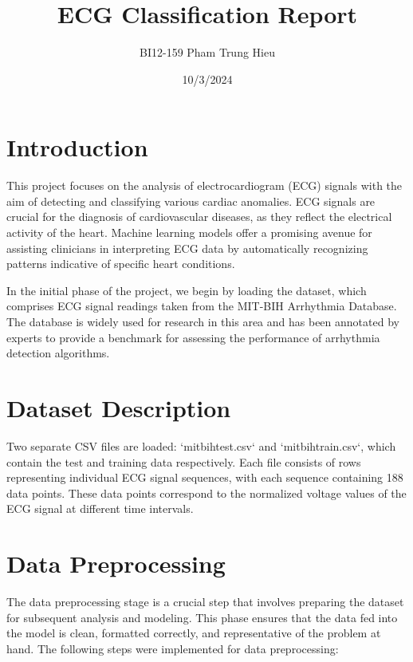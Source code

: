 \documentclass{report}
\title{ECG Classification Report}
\author{BI12-159 Pham Trung Hieu}
\date{10/3/2024}
\begin{document}

\section{Introduction}

This project focuses on the analysis of electrocardiogram (ECG) signals with the aim of detecting and classifying various cardiac anomalies. ECG signals are crucial for the diagnosis of cardiovascular diseases, as they reflect the electrical activity of the heart. Machine learning models offer a promising avenue for assisting clinicians in interpreting ECG data by automatically recognizing patterns indicative of specific heart conditions.

In the initial phase of the project, we begin by loading the dataset, which comprises ECG signal readings taken from the MIT-BIH Arrhythmia Database. The database is widely used for research in this area and has been annotated by experts to provide a benchmark for assessing the performance of arrhythmia detection algorithms.


\section{Dataset Description}

 Two separate CSV files are loaded: `mitbihtest.csv` and `mitbihtrain.csv`, which contain the test and training data respectively. Each file consists of rows representing individual ECG signal sequences, with each sequence containing 188 data points. These data points correspond to the normalized voltage values of the ECG signal at different time intervals. 

\section{Data Preprocessing}
 
The data preprocessing stage is a crucial step that involves preparing the dataset for subsequent analysis and modeling. This phase ensures that the data fed into the model is clean, formatted correctly, and representative of the problem at hand. The following steps were implemented for data preprocessing:
\end{document}
